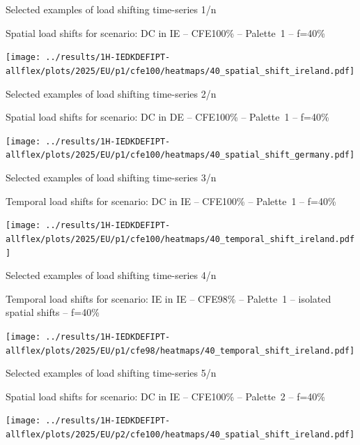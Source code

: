 \begin{frame}{Selected examples of load shifting time-series 1/n}

  {\footnotesize
  \centering

  Spatial load shifts for scenario: DC in IE -- CFE100\% -- Palette~1 -- f=40\% 

  \texttt{[image: ../results/1H-IEDKDEFIPT-allflex/plots/2025/EU/p1/cfe100/heatmaps/40\_spatial\_shift\_ireland.pdf]}
  }
  
\end{frame}


\begin{frame}{Selected examples of load shifting time-series 2/n}

  {\footnotesize
  \centering

  Spatial load shifts for scenario: DC in DE -- CFE100\% -- Palette~1 -- f=40\% 

  \texttt{[image: ../results/1H-IEDKDEFIPT-allflex/plots/2025/EU/p1/cfe100/heatmaps/40\_spatial\_shift\_germany.pdf]}
  }
  
\end{frame}


\begin{frame}{Selected examples of load shifting time-series 3/n}

  {\footnotesize
  \centering

  Temporal load shifts for scenario: DC in IE -- CFE100\% -- Palette~1 -- f=40\% 

  \texttt{[image: ../results/1H-IEDKDEFIPT-allflex/plots/2025/EU/p1/cfe100/heatmaps/40\_temporal\_shift\_ireland.pdf]}
  }
  
\end{frame}


\begin{frame}{Selected examples of load shifting time-series 4/n}

  {\footnotesize
  \centering

  Temporal load shifts for scenario: IE in IE -- CFE98\% -- Palette~1 -- isolated spatial shifts -- f=40\% 

  \texttt{[image: ../results/1H-IEDKDEFIPT-allflex/plots/2025/EU/p1/cfe98/heatmaps/40\_temporal\_shift\_ireland.pdf]}
  }
  
\end{frame}


\begin{frame}{Selected examples of load shifting time-series 5/n}

  {\footnotesize
  \centering

  Spatial load shifts for scenario: DC in IE -- CFE100\% -- Palette~2 -- f=40\% 

  \texttt{[image: ../results/1H-IEDKDEFIPT-allflex/plots/2025/EU/p2/cfe100/heatmaps/40\_spatial\_shift\_ireland.pdf]}
  }
  
\end{frame}


